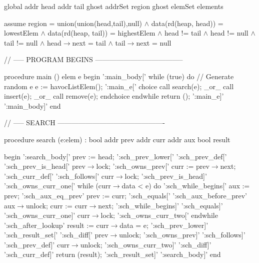    
global
   addr   head   
   addr   tail   
   ghost   addrSet   region   
   ghost   elemSet   elements   
   
assume
   region   =   union(union({head},{tail}),{null})   $\wedge$   
   data(rd(heap,   head))   =   lowestElem   $\wedge$   
   data(rd(heap,   tail))   =   highestElem   $\wedge$   
   head   !=   tail   $\wedge$   
   head   !=   null   $\wedge$   
   tail   !=   null   $\wedge$   
   head$\rightarrow$next   =   tail   $\wedge$   
   tail$\rightarrow$next   =   null   
   
   
//   -----   PROGRAM   BEGINS   --------------------------------------   
                        
                  procedure   main   ()   
                     elem   e   
                  begin   
':main\_body['      while   (true)   do   
                        //   Generate   random   e   
                        e   :=   havocListElem();   
':main\_e['             choice   
                           call   search(e);   
                           _or_   
                           call   insert(e);   
                           _or_   
                           call   remove(e);   
                        endchoice   
                    endwhile   
                    return   ();   
':main\_e]'   
':main\_body]'    end   
   
//   -----   SEARCH   ----------------------------------------------   
   
   
                  procedure   search   (e:elem)   :   bool   
                     addr   prev   
                     addr   curr   
                     addr   aux   
                     bool   result   
   
                  begin   
':search\_body['          prev   :=   head;   
':sch\_prev\_lower['   
':sch\_prev\_def['   
':sch\_prev\_is\_head['   prev$\rightarrow$lock;   
':sch\_owns\_prev['       curr   :=   prev$\rightarrow$next;   
':sch\_curr\_def['   
':sch\_follows['          curr$\rightarrow$lock;   
':sch\_prev\_is\_head]'   
':sch\_owns\_curr\_one['  while   (curr$\rightarrow$data   <   e)   do   
':sch\_while\_begins['        aux   :=   prev;   
':sch\_aux\_eq\_prev'         prev   :=   curr;   
':sch\_equals['   
':sch\_aux\_before\_prev'     aux$\rightarrow$unlock;   
                              curr   :=   curr$\rightarrow$next;   
':sch\_while\_begins]'   
':sch\_equals]'   
':sch\_owns\_curr\_one]'      curr$\rightarrow$lock;   
':sch\_owns\_curr\_two['   endwhile   
':sch\_after\_lookup'      result   :=   curr$\rightarrow$data   =   e;   
':sch\_prev\_lower]'   
':sch\_result\_set['   
':sch\_diff['              prev$\rightarrow$unlock;   
':sch\_owns\_prev]'   
':sch\_follows]'   
':sch\_prev\_def]'         curr$\rightarrow$unlock;   
':sch\_owns\_curr\_two]'   
':sch\_diff]'   
':sch\_curr\_def]'         return   (result);   
':sch\_result\_set]'   
':search\_body]'      end   
   
